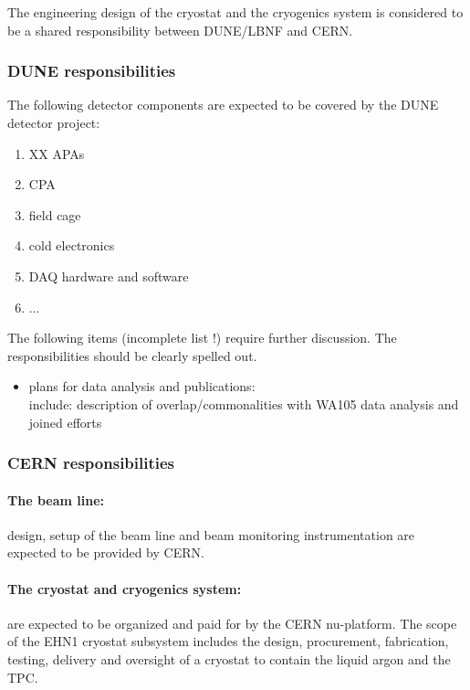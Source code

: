 The engineering design of the cryostat and the cryogenics system is considered to be a shared responsibility between DUNE/LBNF and CERN.

\subsubsection{DUNE responsibilities}

The following detector components are expected to be covered by the DUNE detector project:
\begin{enumerate}
\item XX APAs
\item CPA
\item field cage
\item cold electronics
\item DAQ hardware and software
\item ...
\end{enumerate}

The following items (incomplete list !) require further discussion. The responsibilities should be clearly spelled out.

\begin{itemize}

\item plans for data analysis and publications:\\
include: description of overlap/commonalities with WA105 data analysis and joined efforts

\end{itemize}




\subsubsection{CERN responsibilities}

\paragraph{The beam line:} design, setup of the beam line and beam monitoring instrumentation are expected to be provided by CERN.

\paragraph{The cryostat and cryogenics system:} are expected to be organized and paid for by the CERN nu-platform.
The scope of the EHN1 cryostat subsystem includes the design, procurement, fabrication, testing, delivery and oversight of a cryostat to contain the liquid argon and the TPC.\\

